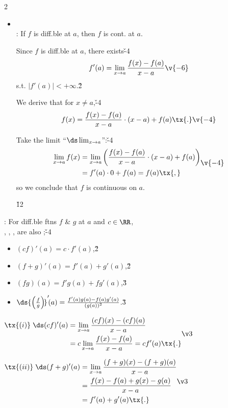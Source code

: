 \documentclass[dvipdfmx,a4paper,titlepage,9pt]{jsarticle}
\begin{document}
\begin{multicols*}{2}
\begin{itemize}[label={-}]
\item{}\\
: If $f$ is diff.ble at $a$, then $f$ is cont. at $a$.

\begin{Pfbox}
Since $f$ is diff.ble at $a$, there exists\v{-4}
$$f'(a)=\lim_{x\to a}\frac{f(x)-f(a)}{x-a}\v{-6}$$
s.t. $|f'(a)|<+\infty$.\v2

We derive that for $x\neq a$,\v{-4}
$$f(x)=\frac{f(x)-f(a)}{x-a}\cdot(x-a)+f(a)\tx{.}\v{-4}$$

Take the limit ``$\ds\lim_{x\to a}$'':\v{-4}
$$\begin{aligned}
  \lim_{x\to a}f(x)&=\lim_{x\to a}\left(\frac{f(x)-f(a)}{x-a}\cdot(x-a)+f(a)\right)\\
  &=f'(a)\cdot0+f(a)=f(a)\tx{,}
  \end{aligned}\v{-4}$$
so we conclude that $f$ is continuous on $a$.
\end{Pfbox}\v{12}
\end{itemize}

: For diff.ble ftns $f$ \& $g$ at $a$ and $c\in\RR$, \\
\;\;, , ,  are also ;\v{-4}
\begin{itemize}[label={-}]
\item $(cf)'(a)=c\cdot f'(a)$,\v2
\item $(f+g)'(a)=f'(a)+g'(a)$,\v2
\item $(fg)(a)=f'g(a)+fg'(a)$,\hfill{}\v3
\item $\ds{\left(\frac fg\right)\!}'\!(a)=\frac{f'(a)g(a)-f(a)g'(a)}{(g(a))^2}$.\hfill{}\v3\\
\end{itemize}
\begin{Pfbox}
\!\!$\begin{aligned}\tx{(i)}\;\ds(cf)'(a)&=\lim_{x\to a}\frac{(cf)(x)-(cf)(a)}{x-a}\\&=c\lim_{x\to a}\frac{f(x)-f(a)}{x-a}=cf'(a)\tx{.}\end{aligned}\v3$

$\begin{aligned}\tx{(ii)}\;\ds(f+g)'(a)&=\lim_{x\to a}\frac{(f+g)(x)-(f+g)(a)}{x-a}\\&=\frac{f(x)-f(a)+g(x)-g(a)}{x-a}\\&=f'(a)+g'(a)\tx{.}\end{aligned}\v3$
\end{Pfbox}


\end{multicols*}
\end{document}
